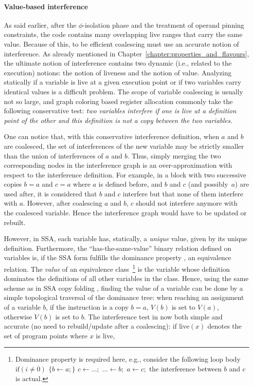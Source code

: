 \paragraph{Value-based interference}
\label{par:alternative_ssa_destruction:value}
As said earlier, after the $\phi$-isolation phase and the treatment of operand pinning constraints, the code contains many overlapping live ranges that carry the same value. 
Because of this, to be efficient coalescing must use an accurate notion of interference. 
As already mentioned in Chapter~\ref{chapter:properties_and_flavours}, the ultimate notion of interference contains two dynamic (i.e., related to the execution) notions: 
the notion of liveness and the notion of value. 
Analyzing statically if a variable is live at a given execution point or if two variables carry identical values is a difficult problem. 
The scope of variable coalescing is usually not so large, and graph coloring based register allocation commonly take the following conservative test: 
\emph{two variables interfere if one is live at a definition point of the other and this definition is not a copy between the two variables}.

One can notice that, with this conservative interference definition, when $a$ and $b$ are coalesced, the set of interferences of the new variable may be strictly smaller than the union of interferences of $a$ and $b$. 
Thus, simply merging the two corresponding nodes in the interference graph is an over-approximation with respect to the interference definition. 
For example, in a block with two successive copies $b=a$ and $c=a$ where $a$ is defined before, and $b$ and $c$ (and possibly~$a$) are used after, it is considered that $b$ and $c$ interfere but that none of them interfere with $a$. 
However, after coalescing $a$ and $b$, $c$ should not interfere anymore with the coalesced variable. 
Hence the interference graph would have to be updated or rebuilt.


However, in SSA, each variable has, statically, a \emph{unique} value, given by its unique definition. 
Furthermore, the ``has-the-same-value'' binary relation defined on variables is, if the SSA form fulfills the dominance property , an equivalence relation. 
The \emph{value} of an equivalence class~\footnote{Dominance property is required here, e.g., consider the following loop body $\textrm{if}(i\neq 0)$ $\{b\gets a;\}$ $c\gets\dots;$ $\dots\gets b;$ $a\gets c;$ the interference between $b$ and $c$ is actual.} 
is the variable whose definition dominates the definitions of all other variables in the class. 
Hence, using the same scheme as in SSA copy folding , finding the value of a variable can be done by a simple topological traversal of the dominance tree: 
when reaching an assignment of a variable $b$, if the instruction is a copy $b=a$, $V(b)$ is set to $V(a)$, otherwise $V(b)$ is set to $b$. 
The interference test in now both simple and accurate (no need to rebuild/update after a coalescing): 
if $\textrm{live}(x)$ denotes the set of program points where $x$ is live,

